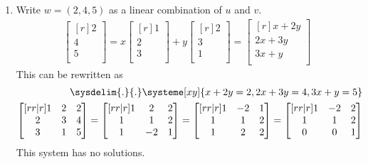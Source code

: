 \documentclass[12pt]{article}
\begin{document}
\begin{enumerate}
\begin{enumerate}
\pagebreak
	\item Write $w=(2,4,5)$ as a linear combination of $u$ and $v$.\\
		\begin{align*}
		\begin{bmatrix}[r]2\\4\\5\\ \end{bmatrix}
		= x \begin{bmatrix}[r] 1\\2\\3\\ \end{bmatrix}
		+ y \begin{bmatrix}[r] 2\\3\\1\\ \end{bmatrix}
		= \begin{bmatrix}[r] x+2y\\ 2x+3y\\ 3x+y\\ \end{bmatrix}
		\end{align*}
		This can be rewritten as
		\begin{align*}
		\sysdelim{.}{.}\systeme[xy]{x+2y=2,2x+3y=4,3x+y=5}\\
		\begin{bmatrix}[rr|r] 1&2&2\\2&3&4\\3&1&5\\ \end{bmatrix}
		= \begin{bmatrix}[rr|r] 1&2&2\\1&1&2\\1&-2&1\\ \end{bmatrix}
		= \begin{bmatrix}[rr|r] 1&-2&1\\1&1&2\\1&2&2\\ \end{bmatrix}
		= \begin{bmatrix}[rr|r] 1&-2&2\\1&1&2\\0&0&1\\ \end{bmatrix}
		\end{align*}
		This system has no solutions.\\


\end{enumerate}
\end{enumerate}
\end{document}

